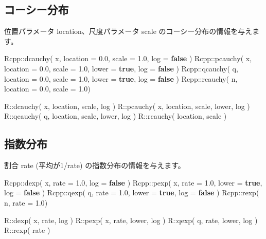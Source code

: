 \documentclass[]{book}
\newenvironment{Shaded}{\begin{snugshade}}{\end{snugshade}}
\newcommand{\FloatTok}[1]{\textcolor[rgb]{0.00,0.00,0.81}{#1}}
\newcommand{\KeywordTok}[1]{\textcolor[rgb]{0.13,0.29,0.53}{\textbf{#1}}}
\newcommand{\NormalTok}[1]{#1}
\begin{document}
\subsection{コーシー分布}

位置パラメータ location、尺度パラメータ scale のコーシー分布の情報を与えます。

\begin{Shaded}
\begin{Highlighting}[]
\NormalTok{Rcpp::dcauchy( x, location = }\FloatTok{0.0}\NormalTok{, scale = }\FloatTok{1.0}\NormalTok{,               log = }\KeywordTok{false}\NormalTok{ )}
\NormalTok{Rcpp::pcauchy( x, location = }\FloatTok{0.0}\NormalTok{, scale = }\FloatTok{1.0}\NormalTok{, lower = }\KeywordTok{true}\NormalTok{, log = }\KeywordTok{false}\NormalTok{ )}
\NormalTok{Rcpp::qcauchy( q, location = }\FloatTok{0.0}\NormalTok{, scale = }\FloatTok{1.0}\NormalTok{, lower = }\KeywordTok{true}\NormalTok{, log = }\KeywordTok{false}\NormalTok{ )}
\NormalTok{Rcpp::rcauchy( n, location = }\FloatTok{0.0}\NormalTok{, scale = }\FloatTok{1.0}\NormalTok{)}

\NormalTok{R::dcauchy( x, location, scale,        log )}
\NormalTok{R::pcauchy( x, location, scale, lower, log )}
\NormalTok{R::qcauchy( q, location, scale, lower, log )}
\NormalTok{R::rcauchy(    location, scale )}
\end{Highlighting}
\end{Shaded}

\subsection{指数分布}

割合 rate (平均が1/rate) の指数分布の情報を与えます。

\begin{Shaded}
\begin{Highlighting}[]
\NormalTok{Rcpp::dexp( x, rate = }\FloatTok{1.0}\NormalTok{,               log = }\KeywordTok{false}\NormalTok{ )}
\NormalTok{Rcpp::pexp( x, rate = }\FloatTok{1.0}\NormalTok{, lower = }\KeywordTok{true}\NormalTok{, log = }\KeywordTok{false}\NormalTok{ )}
\NormalTok{Rcpp::qexp( q, rate = }\FloatTok{1.0}\NormalTok{, lower = }\KeywordTok{true}\NormalTok{, log = }\KeywordTok{false}\NormalTok{ )}
\NormalTok{Rcpp::rexp( n, rate = }\FloatTok{1.0}\NormalTok{)}

\NormalTok{R::dexp( x, rate,        log )}
\NormalTok{R::pexp( x, rate, lower, log )}
\NormalTok{R::qexp( q, rate, lower, log )}
\NormalTok{R::rexp(    rate )}
\end{Highlighting}
\end{Shaded}
\end{document}
